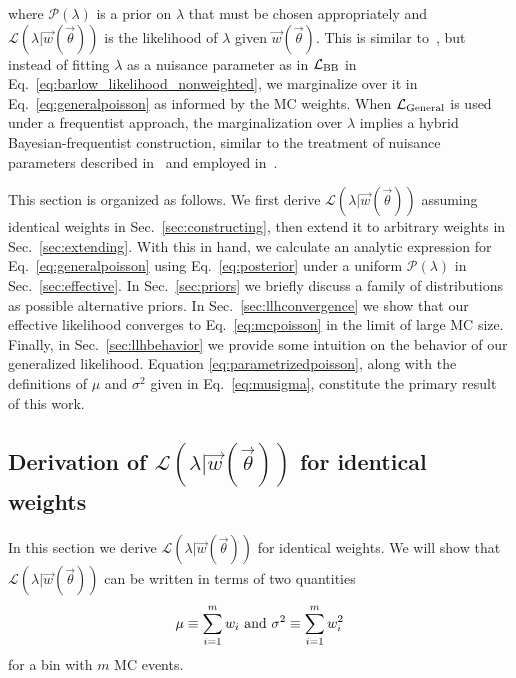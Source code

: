 \documentclass[a4paper, 11pt]{article}
\newcommand{\like}{\mathcal{L}}
\newcommand{\vectheta}{\vec{\theta}}
\newcommand{\vecw}{\vec{w}}
\newcommand{\prob}{\mathcal{P}}
\newcommand{\lbarlow}{\like_{\textmd{BB}}}
\begin{document}
where $\prob(\lambda)$ is a prior on $\lambda$ that must be chosen appropriately and $\like(\lambda|\vecw(\vectheta))$ is the likelihood of $\lambda$ given $\vecw(\vectheta)$. This is similar to~\cite{Barlow:1993dm, Cranmer:2012sba}, but instead of fitting $\lambda$ as a nuisance parameter as in $\lbarlow$ in Eq.~\eqref{eq:barlow_likelihood_nonweighted}, we marginalize over it in Eq.~\eqref{eq:generalpoisson} as informed by the MC weights. When $\like_{\rm General}$ is used under a frequentist approach, the marginalization over $\lambda$ implies a hybrid Bayesian-frequentist construction, similar to the treatment of nuisance parameters described in~\cite{Cousins:1991qz} and employed in~\cite{Abe:2017vif, Abe:2018wpn}.

This section is organized as follows. We first derive $\like(\lambda|\vecw(\vectheta))$ assuming identical weights in Sec.~\ref{sec:constructing}, then extend it to arbitrary weights in Sec.~\ref{sec:extending}. With this in hand, we calculate an analytic expression for Eq.~\eqref{eq:generalpoisson} using Eq.~\eqref{eq:posterior} under a uniform $\prob(\lambda)$ in Sec.~\ref{sec:effective}. In Sec.~\ref{sec:priors} we briefly discuss a family of distributions as possible alternative priors. In Sec.~\ref{sec:llhconvergence} we show that our effective likelihood converges to Eq.~\eqref{eq:mcpoisson} in the limit of large MC size. Finally, in Sec.~\ref{sec:llhbehavior} we provide some intuition on the behavior of our generalized likelihood. Equation \eqref{eq:parametrizedpoisson}, along with the definitions of $\mu$ and $\sigma^2$ given in Eq.~\eqref{eq:musigma}, constitute the primary result of this work.

\subsection{Derivation of $\like (\lambda|\vecw(\vectheta))$ for identical weights\label{sec:constructing}}
In this section we derive $\like(\lambda|\vecw(\vectheta))$ for identical weights. We will show that $\like(\lambda|\vecw(\vectheta))$ can be written in terms of two quantities
\begin{equation}\label{eq:musigma}
\mu \equiv \sum_{i=1}^m w_i~\textmd{and}~\sigma^2 \equiv \sum_{i=1}^m w_i^2
\end{equation}
for a bin with $m$ MC events.
\end{document}
